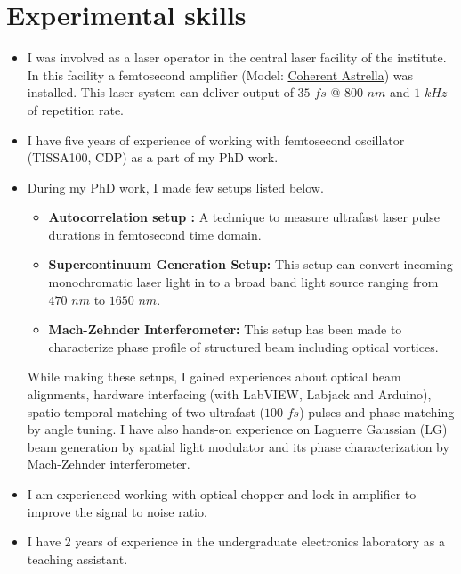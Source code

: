 \documentclass[11pt,a4paper,sans]{moderncv}        %
\begin{document}
\section{Experimental skills}
\begin{itemize}
	\item{ I was involved as a laser operator in the central laser facility of the institute. In this facility a femtosecond amplifier (Model: \href{https://www.coherent.com/lasers/amplifiers/astrella}{\color{blue}Coherent Astrella}) was installed. This laser system can deliver output of $35$ $fs$ @ $800$ $nm$ and $1$ $kHz$ of repetition rate.}
	
	\vspace{4pt}
	
	\item{I have five years of experience of working with femtosecond oscillator (TISSA100, CDP) as a part of my PhD work.}
	
	
	\vspace{4pt}
	
	
	\item{During my PhD work, I made few setups listed below.
		\vspace{3pt}
		\begin{itemize}
			\item{\textbf{Autocorrelation setup :} A technique to measure ultrafast laser pulse durations in femtosecond time domain.}
			\item{\textbf{Supercontinuum Generation Setup:} This setup can convert incoming monochromatic laser light in to a broad band light source ranging from $470$ $nm$ to $1650$ $nm$.}
			\item{\textbf{Mach-Zehnder Interferometer:} This setup has been made to characterize phase profile of structured beam including optical vortices.}
		\end{itemize}	
		\vspace{3pt}
		
		While making these setups, I gained experiences about optical beam alignments, hardware interfacing (with LabVIEW, Labjack and Arduino), spatio-temporal matching of two ultrafast ($100$ $fs$) pulses and phase matching by angle tuning. I have also hands-on experience on Laguerre Gaussian (LG) beam generation by spatial light modulator and its phase characterization by Mach-Zehnder interferometer.}
	
	\vspace{4pt}
	

	\item{I am experienced working with optical chopper and lock-in amplifier to improve the signal to noise ratio.}
	
	\vspace{4pt}
	
	\item{I have 2 years of experience in the undergraduate electronics laboratory as a teaching assistant.}
\end{itemize}
\end{document}
